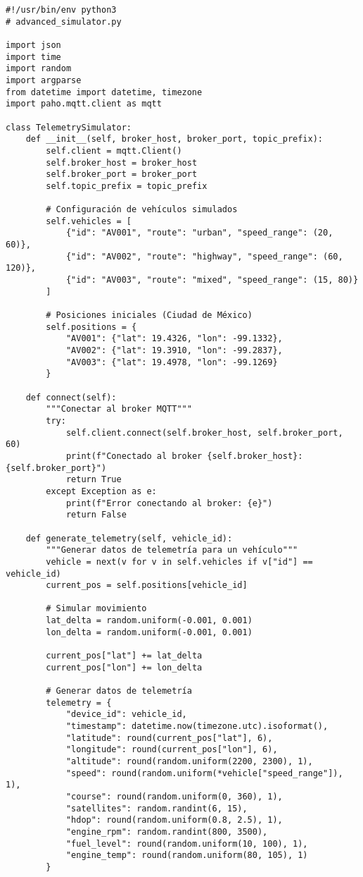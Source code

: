 \begin{verbatim}
#!/usr/bin/env python3
# advanced_simulator.py

import json
import time
import random
import argparse
from datetime import datetime, timezone
import paho.mqtt.client as mqtt

class TelemetrySimulator:
    def __init__(self, broker_host, broker_port, topic_prefix):
        self.client = mqtt.Client()
        self.broker_host = broker_host
        self.broker_port = broker_port
        self.topic_prefix = topic_prefix
        
        # Configuración de vehículos simulados
        self.vehicles = [
            {"id": "AV001", "route": "urban", "speed_range": (20, 60)},
            {"id": "AV002", "route": "highway", "speed_range": (60, 120)},
            {"id": "AV003", "route": "mixed", "speed_range": (15, 80)}
        ]
        
        # Posiciones iniciales (Ciudad de México)
        self.positions = {
            "AV001": {"lat": 19.4326, "lon": -99.1332},
            "AV002": {"lat": 19.3910, "lon": -99.2837},
            "AV003": {"lat": 19.4978, "lon": -99.1269}
        }
    
    def connect(self):
        """Conectar al broker MQTT"""
        try:
            self.client.connect(self.broker_host, self.broker_port, 60)
            print(f"Conectado al broker {self.broker_host}:{self.broker_port}")
            return True
        except Exception as e:
            print(f"Error conectando al broker: {e}")
            return False
    
    def generate_telemetry(self, vehicle_id):
        """Generar datos de telemetría para un vehículo"""
        vehicle = next(v for v in self.vehicles if v["id"] == vehicle_id)
        current_pos = self.positions[vehicle_id]
        
        # Simular movimiento
        lat_delta = random.uniform(-0.001, 0.001)
        lon_delta = random.uniform(-0.001, 0.001)
        
        current_pos["lat"] += lat_delta
        current_pos["lon"] += lon_delta
        
        # Generar datos de telemetría
        telemetry = {
            "device_id": vehicle_id,
            "timestamp": datetime.now(timezone.utc).isoformat(),
            "latitude": round(current_pos["lat"], 6),
            "longitude": round(current_pos["lon"], 6),
            "altitude": round(random.uniform(2200, 2300), 1),
            "speed": round(random.uniform(*vehicle["speed_range"]), 1),
            "course": round(random.uniform(0, 360), 1),
            "satellites": random.randint(6, 15),
            "hdop": round(random.uniform(0.8, 2.5), 1),
            "engine_rpm": random.randint(800, 3500),
            "fuel_level": round(random.uniform(10, 100), 1),
            "engine_temp": round(random.uniform(80, 105), 1)
        }
        

\end{verbatim}
